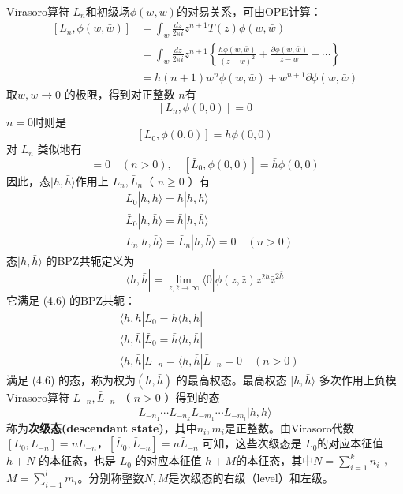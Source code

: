 Virasoro算符 $L_n $和初级场$ \phi(w,\bar{w}) $的对易关系，可由OPE计算：
\begin{equation}
	\begin{aligned} \left[L_{n}, \phi(w, \bar{w})\right] &=\int_{w} \frac{d z}{2 \pi i} z^{n+1} T(z) \phi(w, \bar{w}) \\ &=\int_{w} \frac{d z}{2 \pi i} z^{n+1}\left\{\frac{h \phi(w, \bar{w})}{(z-w)^{2}}+\frac{\partial \phi(w, \bar{w})}{z-w}+\cdots\right\} \\ &=h(n+1) w^{n} \phi(w, \bar{w})+w^{n+1} \partial \phi(w, \bar{w}) \end{aligned}
\end{equation}
取$ w,\bar{w}\to 0$ 的极限，得到对正整数 $n $有
\begin{equation}
	\left[L_{n}, \phi(0,0)\right]=0
\end{equation}
$n=0 $时则是
\begin{equation}
	\left[L_{0}, \phi(0,0)\right]=h \phi(0,0)
\end{equation}
对 $\bar{L}_n$ 类似地有
\begin{equation}
	[\bar{L}_{n}, \phi(0,0)]=0 \quad(n>0), \quad [\bar{L}_{0}, \phi(0,0) ]=\bar{h} \phi(0,0)
\end{equation}
因此，态$ |h,\bar{h}\rangle $作用上 $L_n,\bar{L}_n $（ $n\geq 0$ ）有
\begin{equation}
	\begin{aligned} &L_{0}|h, \bar{h}\rangle=h|h, \bar{h}\rangle \\ &\bar{L}_{0}|h, \bar{h}\rangle=\bar{h}|h, \bar{h}\rangle \\ &L_{n}|h, \bar{h}\rangle=\bar{L}_{n}|h, \bar{h}\rangle=0 \quad(n>0) \end{aligned}
\end{equation}
态$ |h,\bar{h}\rangle$ 的BPZ共轭定义为
\begin{equation}
\langle h, \bar{h}|=\lim _{z, \bar{z} \rightarrow \infty}\langle 0| \phi(z, \bar{z}) z^{2 h} \bar{z}^{2 \bar{h}}
\end{equation}
它满足 (4.6) 的BPZ共轭：
\begin{equation}
	\begin{aligned} &\langle h, \bar{h}| L_{0}=h\langle h, \bar{h}| \\& \langle h, \bar{h}| \bar{L}_{0}=\bar{h}\langle h, \bar{h}| \\& \langle h, \bar{h}| L_{-n}=\langle h, \bar{h}| \bar{L}_{-n}=0 \quad(n>0) \end{aligned}
\end{equation}
满足 (4.6) 的态，称为权为$ (h,\bar{h})$ 的最高权态。最高权态 $|h,\bar{h}\rangle$ 多次作用上负模Virasoro算符 $L_{-n},\bar{L}_{-n}$ （ $n>0$ ）得到的态
\begin{equation}
L_{-n_{1}} \cdots L_{-n_{k}} \bar{L}_{-m_{1}} \cdots \bar{L}_{-m_{l}}|h, \bar{h}\rangle
\end{equation}
称为\textbf{次级态(descendant state)}，其中$ n_i,m_i $是正整数。由Virasoro代数 $[L_{0}, L_{-n} ]=n L_{-n}$，$ [\bar{L}_{0}, \bar{L}_{-n} ]=n \bar{L}_{-n}$ 可知，这些次级态是 $L_0 $的对应本征值 $h+N$ 的本征态，也是 $\bar{L}_0$ 的对应本征值 $\bar{h}+M $的本征态，其中$ N=\sum_{i=1}^{k} n_{i}$ ， $M=\sum_{i=1}^{l} m_{i} $。分别称整数$ N,M $是次级态的右级（level）和左级。

